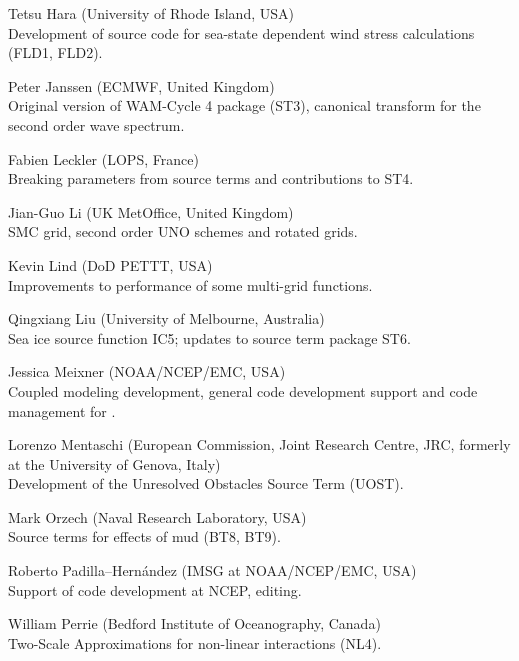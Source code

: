 \begin{list}{\ldots}{ }
\item [Tetsu Hara] (University of Rhode Island, USA) \\
  Development of source code for sea-state dependent wind stress calculations (FLD1, FLD2).

\item [Peter Janssen] (ECMWF, United Kingdom) \\
  Original version of WAM-Cycle 4 package (ST3), canonical transform for the second order wave spectrum.

\item [Fabien Leckler] (LOPS, France) \\
  Breaking parameters from source terms and contributions to ST4.

\item [Jian-Guo Li] (UK MetOffice, United Kingdom) \\
  SMC grid, second order UNO schemes and rotated grids.

\item [Kevin Lind]  (DoD PETTT, USA)\\ 
  Improvements to performance of some multi-grid functions.
 
\item [Qingxiang Liu] (University of Melbourne, Australia)\\
  Sea ice source function IC5; updates to source term package ST6.

\item [Jessica Meixner] (NOAA/NCEP/EMC, USA) \\
  Coupled modeling development, general code development support and code management for \ws.
 
\item [Lorenzo Mentaschi]  (European Commission, Joint Research Centre, JRC,
  formerly at the University of Genova, Italy)\\ 
  Development of the Unresolved Obstacles Source Term (UOST).
 
\item [Mark Orzech]  (Naval Research Laboratory, USA)\\ 
  Source terms for effects of mud (BT8, BT9).

\item [Roberto Padilla--Hern\'andez]  (IMSG at NOAA/NCEP/EMC, USA)\\ 
  Support of code development at NCEP, editing.

\item [William Perrie] (Bedford Institute of Oceanography, Canada)\\
 Two-Scale Approximations for non-linear interactions (NL4).


\end{list}
